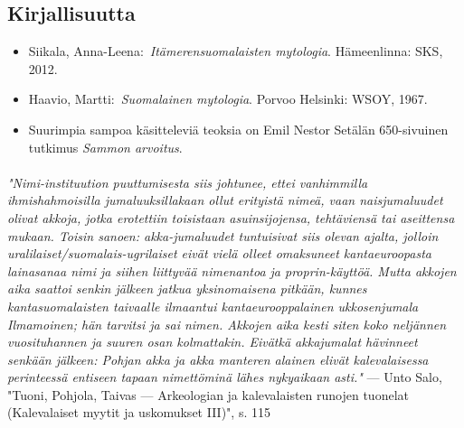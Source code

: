 \subsection{Kirjallisuutta}

  \begin{itemize}
    \item Siikala, Anna-Leena: \emph{Itämerensuomalaisten mytologia}. Hämeenlinna: SKS, 2012. 
    \item Haavio, Martti: \emph{Suomalainen mytologia}. Porvoo Helsinki: WSOY, 1967. 
    \item Suurimpia sampoa käsitteleviä teoksia on Emil Nestor Setälän 650-sivuinen tutkimus \emph{Sammon arvoitus}.
  \end{itemize}

  \paragraph{}
    \emph{"Nimi-instituution puuttumisesta siis johtunee, ettei vanhimmilla ihmishahmoisilla
    jumaluuksillakaan ollut erityistä nimeä, vaan naisjumaluudet olivat akkoja, jotka erotettiin
    toisistaan asuinsijojensa, tehtäviensä tai aseittensa mukaan. Toisin sanoen: akka-jumaluudet
    tuntuisivat siis olevan ajalta, jolloin uralilaiset/suomalais-ugrilaiset eivät vielä olleet
    omaksuneet kantaeuroopasta lainasanaa nimi ja siihen liittyvää nimenantoa ja proprin-käyttöä.
    Mutta akkojen aika saattoi senkin jälkeen jatkua yksinomaisena pitkään, kunnes kantasuomalaisten
    taivaalle ilmaantui kantaeurooppalainen ukkosenjumala Ilmamoinen; hän tarvitsi ja sai nimen.
    Akkojen aika kesti siten koko neljännen vuosituhannen ja suuren osan kolmattakin. Eivätkä
    akkajumalat hävinneet senkään jälkeen: Pohjan akka ja akka manteren alainen elivät kalevalaisessa
    perinteessä entiseen tapaan nimettöminä lähes nykyaikaan asti."} --- Unto Salo, "Tuoni, Pohjola,
    Taivas --- Arkeologian ja kalevalaisten runojen tuonelat (Kalevalaiset myytit ja
    uskomukset III)", s. 115
